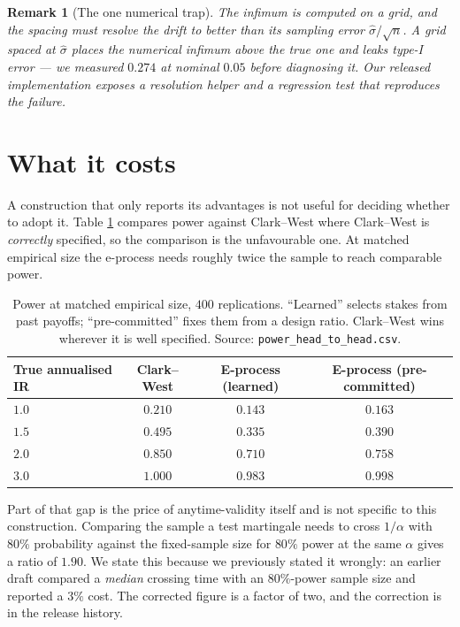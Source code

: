 \documentclass{article}
\newtheorem{remark}[theorem]{Remark}
\begin{document}
\begin{remark}[The one numerical trap]
The infimum is computed on a grid, and the spacing must resolve the drift to better than its
sampling error $\hat\sigma/\sqrt{n}$. A grid spaced at $\hat\sigma$ places the numerical
infimum above the true one and leaks type-I error --- we measured $0.274$ at nominal $0.05$
before diagnosing it. Our released implementation exposes a resolution helper and a regression
test that reproduces the failure.
\end{remark}

\section{What it costs}

A construction that only reports its advantages is not useful for deciding whether to adopt
it. Table \ref{tab:power} compares power against Clark--West where Clark--West is
\emph{correctly} specified, so the comparison is the unfavourable one. At matched empirical
size the e-process needs roughly twice the sample to reach comparable power.

\begin{table}[h]
  \centering
  \caption{Power at matched empirical size, $400$ replications. ``Learned'' selects stakes from
  past payoffs; ``pre-committed'' fixes them from a design ratio. Clark--West wins wherever it
  is well specified. Source: \texttt{power\_head\_to\_head.csv}.}
  \label{tab:power}
  \small
  \begin{tabular}{lccc}
    \toprule
    True annualised IR & Clark--West & E-process (learned) & E-process (pre-committed) \\
    \midrule
    $1.0$ & $0.210$ & $0.143$ & $0.163$ \\
    $1.5$ & $0.495$ & $0.335$ & $0.390$ \\
    $2.0$ & $0.850$ & $0.710$ & $0.758$ \\
    $3.0$ & $1.000$ & $0.983$ & $0.998$ \\
    \bottomrule
  \end{tabular}
\end{table}

Part of that gap is the price of anytime-validity itself and is not specific to this
construction. Comparing the sample a test martingale needs to cross $1/\alpha$ with $80\%$
probability against the fixed-sample size for $80\%$ power at the same $\alpha$ gives a ratio
of $\mathbf{1.90}$. We state this because we previously stated it wrongly: an earlier draft
compared a \emph{median} crossing time with an $80\%$-power sample size and reported a $3\%$
cost. The corrected figure is a factor of two, and the correction is in the release history.
\end{document}
